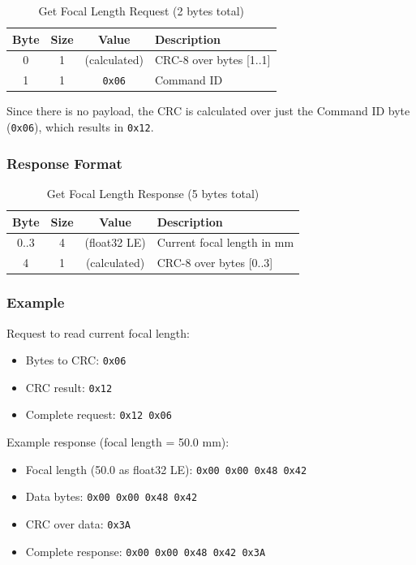 \documentclass[12pt, titlepage]{article}
\begin{document}
\begin{table}[H]
  \centering
  \begin{tabular}{cccl}
    \toprule
    \textbf{Byte} & \textbf{Size} & \textbf{Value} & \textbf{Description}    \\
    \midrule
    0             & 1             & (calculated)   & CRC-8 over bytes [1..1] \\
    1             & 1             & \texttt{0x06}  & Command ID              \\
    \bottomrule
  \end{tabular}
  \caption{Get Focal Length Request (2 bytes total)}
\end{table}

Since there is no payload, the CRC is calculated over just the Command ID byte
(\texttt{0x06}), which results in \texttt{0x12}.

\subsubsection{Response Format}

\begin{table}[H]
  \centering
  \begin{tabular}{cccl}
    \toprule
    \textbf{Byte} & \textbf{Size} & \textbf{Value} & \textbf{Description}       \\
    \midrule
    0..3          & 4             & (float32 LE)   & Current focal length in mm \\
    4             & 1             & (calculated)   & CRC-8 over bytes [0..3]    \\
    \bottomrule
  \end{tabular}
  \caption{Get Focal Length Response (5 bytes total)}
\end{table}

\subsubsection{Example}

Request to read current focal length:
\begin{itemize}
  \item Bytes to CRC: \texttt{0x06}
  \item CRC result: \texttt{0x12}
  \item Complete request: \texttt{0x12 0x06}
\end{itemize}

Example response (focal length = 50.0 mm):
\begin{itemize}
  \item Focal length (50.0 as float32 LE): \texttt{0x00 0x00 0x48 0x42}
  \item Data bytes: \texttt{0x00 0x00 0x48 0x42}
  \item CRC over data: \texttt{0x3A}
  \item Complete response: \texttt{0x00 0x00 0x48 0x42 0x3A}
\end{itemize}
\end{document}
